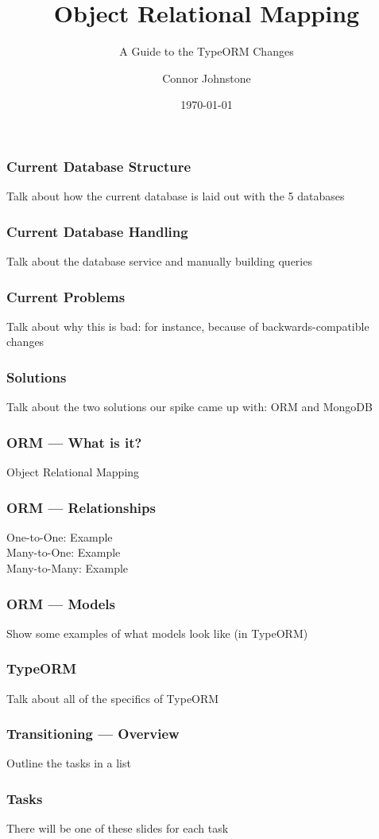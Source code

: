 \documentclass{beamer}
\title[]{Object Relational Mapping}
\subtitle[]{A Guide to the TypeORM Changes}
\author[]{Connor Johnstone\\ \vspace{-10pt}}
\institute[]{Palski and Associates\\ \vspace{-10pt}}
\date[]{\tiny{\today}}
\begin{document}
  \begin{frame}
  \titlepage
  \end{frame}

  \begin{frame}[fragile]
  \frametitle{Current Database Structure}
  Talk about how the current database is laid out with the 5 databases
  \end{frame}

  \begin{frame}[fragile]
  \frametitle{Current Database Handling}
  Talk about the database service and manually building queries
  \end{frame}

  \begin{frame}[fragile]
  \frametitle{Current Problems}
  Talk about why this is bad: for instance, because of backwards-compatible changes
  \end{frame}

  \begin{frame}[fragile]
  \frametitle{Solutions}
  Talk about the two solutions our spike came up with: ORM and MongoDB
  \end{frame}

  \begin{frame}[fragile]
  \frametitle{ORM --- What is it?}
  Object Relational Mapping
  \end{frame}

  \begin{frame}[fragile]
  \frametitle{ORM --- Relationships}
  One-to-One: Example \\
  Many-to-One: Example \\
  Many-to-Many: Example
  \end{frame}

  \begin{frame}[fragile]
  \frametitle{ORM --- Models}
    Show some examples of what models look like (in TypeORM)
  \end{frame}

  \begin{frame}[fragile]
  \frametitle{TypeORM}
  Talk about all of the specifics of TypeORM
  \end{frame}

  \begin{frame}[fragile]
  \frametitle{Transitioning --- Overview}
  Outline the tasks in a list
  \end{frame}

  \begin{frame}[fragile]
  \frametitle{Tasks}
  There will be one of these slides for each task
  \end{frame}
\end{document}
